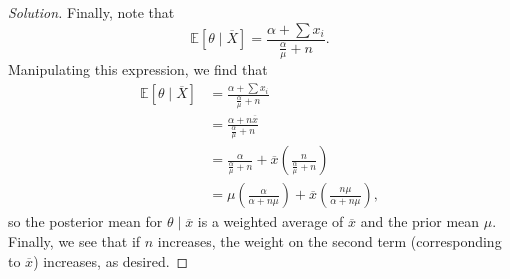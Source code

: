 \documentclass[11pt]{article}
\newenvironment{solution}
  {\renewcommand\qedsymbol{$\blacksquare$}\begin{proof}[Solution]}
  {\end{proof}}
\begin{document}
\begin{enumerate}
\begin{enumerate}[a)]
\begin{solution}
        Finally, note that
        \[
            \mathbb{E}\left[\theta \mid \overline{X}  \right] = \frac{\alpha + \sum x_i}{\frac{\alpha}{\mu} + n}.
        \]
        Manipulating this expression, we find that
        \begin{align*}
            \mathbb{E}\left[\theta \mid \overline{X}  \right] &= \frac{\alpha + \sum x_i}{\frac{\alpha}{\mu} + n} \\
            &= \frac{\alpha + n \overline{x}}{\frac{\alpha}{\mu} + n} \\
            &= \frac{\alpha}{\frac{\alpha}{\mu} + n} + \overline{x}\left(\frac{n}{\frac{\alpha}{\mu} + n}\right) \\
            &= \mu \left(\frac{\alpha}{\alpha + n\mu}\right) + \overline{x}\left(\frac{n\mu}{\alpha + n\mu}\right),
        \end{align*}
        so the posterior mean for $\theta \mid \overline{x}$ is a weighted average of $\overline{x}$ and the prior mean $\mu$. Finally, we see that if $n$ increases, the weight on the second term (corresponding to $\overline{x}$) increases, as desired.
        \end{solution}
        
    \end{enumerate}
    
\end{enumerate}
\end{document}
